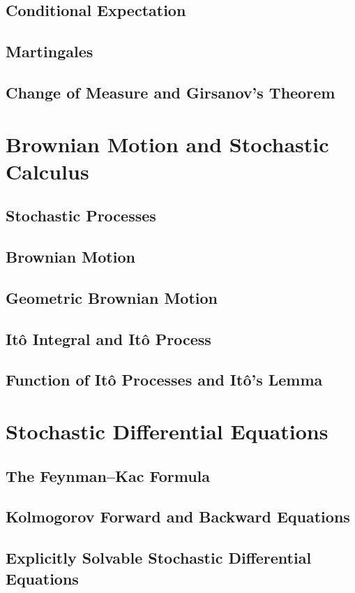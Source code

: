 \documentclass{book}
\begin{document}
\subsection{Conditional Expectation}
\subsection{Martingales}
\subsection{Change of Measure and Girsanov's Theorem}

\section{Brownian Motion and Stochastic Calculus}
\subsection{Stochastic Processes}
\subsection{Brownian Motion}
\subsection{Geometric Brownian Motion}
\subsection{It\^o Integral and It\^o Process}
\subsection{Function of It\^o Processes and It\^o's Lemma}

\section{Stochastic Differential Equations}
\subsection{The Feynman--Kac Formula}
\subsection{Kolmogorov Forward and Backward Equations}
\subsection{Explicitly Solvable Stochastic Differential Equations}
\end{document}
